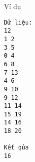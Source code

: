 Ví dụ
\begin{verbatim}
Dữ liệu:
12
1 2
3 5
0 4
6 8
7 13
4 6
9 10
9 12
11 14
15 19
14 16
18 20

Kết qủa
16
\end{verbatim}